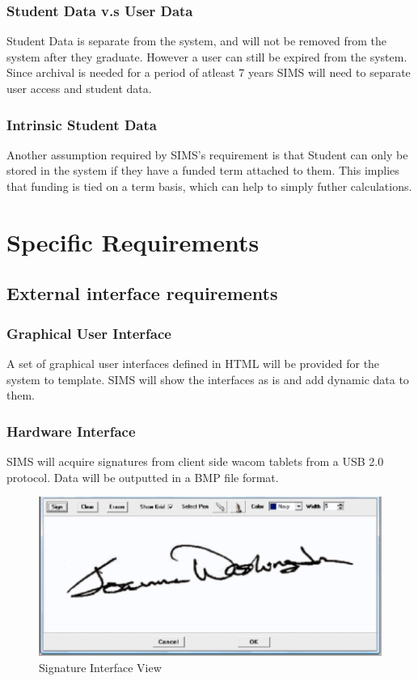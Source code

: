 \documentclass{journal}
\begin{document}
\subsubsection{Student Data v.s User Data}
Student Data is separate from the system, and will not be removed from the system after they graduate. However a user can still be expired from the system. Since archival is needed for a period of atleast 7 years SIMS will need to separate user access and student data. 
\subsubsection{Intrinsic Student Data}
Another assumption required by SIMS's requirement is that Student can only be stored in the system if they have a funded term attached to them. This implies that funding is tied on a term basis, which can help to simply futher calculations. 

\section{Specific Requirements}
\subsection{External interface requirements}
\subsubsection{Graphical User Interface}
A set of graphical user interfaces defined in HTML will be provided for the system to template. SIMS will show the interfaces as is and add dynamic data to them. 
\subsubsection{Hardware Interface}
SIMS will acquire signatures from client side wacom tablets from a USB 2.0 protocol. Data will be outputted in a BMP file format. 

\begin{figure}[htp]
\centering
\includegraphics[scale=0.75]{diagrams/HTMLTemplating/Figure6.png}
\caption{Signature Interface View}
\label{fig:signature}
\end{figure}
\end{document}
